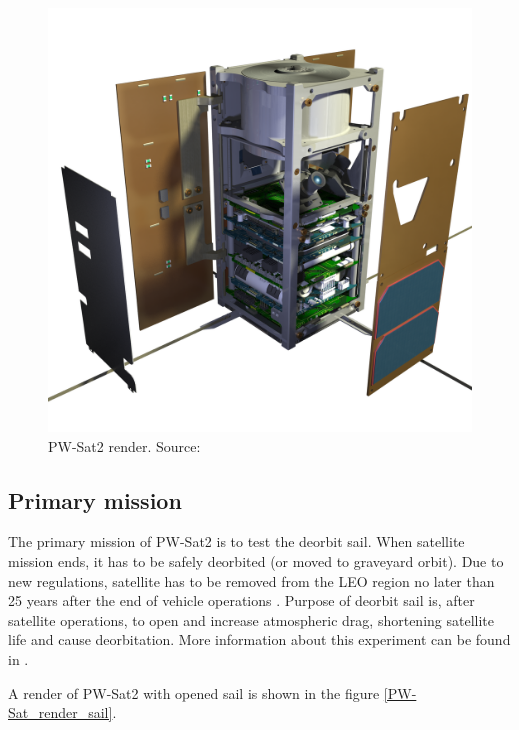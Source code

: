     \begin{figure}[H]
        \centering
        \includegraphics[width=0.65\paperwidth]{img/04/PW-Sat2_render_01.png}
        \caption{PW-Sat2 render. Source: \cite{PW_sat2_photo}}
        \label{PW-Sat_render_01}
    \end{figure}




    \subsection{Primary mission}
        The primary mission of PW-Sat2 is to test the deorbit sail. When satellite mission ends, it has to be safely deorbited (or moved to graveyard orbit). Due to new regulations, satellite has to be removed from
        the LEO region no later than 25 years after the end of vehicle operations \cite{Satellite_disposal}. Purpose of deorbit sail is, after satellite operations, to open and increase atmospheric drag, shortening satellite life and cause deorbitation. More information about this experiment can be found in \cite{DDC_article}.
        
        A render of PW-Sat2 with opened sail is shown in the figure \ref{PW-Sat_render_sail}.

